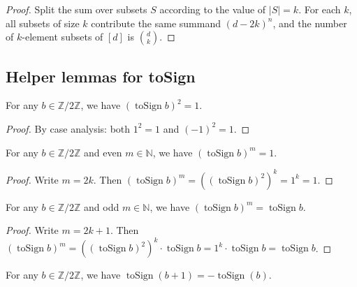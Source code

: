 \begin{proof}
\leanok
Split the sum over subsets $S$ according to the value of $|S| = k$.
For each $k$, all subsets of size $k$ contribute the same summand $(d-2k)^n$,
and the number of $k$-element subsets of $[d]$ is $\binom{d}{k}$.
\end{proof}

\subsection{Helper lemmas for toSign}

\begin{lemma}
\label{lem.cancel.toSign-sq}
\leanhelper
\leanok
For any $b \in \mathbb{Z}/2\mathbb{Z}$, we have $(\operatorname{toSign} b)^2 = 1$.
\end{lemma}

\begin{proof}
\leanok
By case analysis: both $1^2 = 1$ and $(-1)^2 = 1$.
\end{proof}

\begin{lemma}
\label{lem.cancel.toSign-pow-even}
\leanhelper
\leanok
For any $b \in \mathbb{Z}/2\mathbb{Z}$ and even $m \in \mathbb{N}$,
we have $(\operatorname{toSign} b)^m = 1$.
\end{lemma}

\begin{proof}
\leanok
Write $m = 2k$. Then $(\operatorname{toSign} b)^m = ((\operatorname{toSign} b)^2)^k = 1^k = 1$.
\end{proof}

\begin{lemma}
\label{lem.cancel.toSign-pow-odd}
\leanhelper
\leanok
For any $b \in \mathbb{Z}/2\mathbb{Z}$ and odd $m \in \mathbb{N}$,
we have $(\operatorname{toSign} b)^m = \operatorname{toSign} b$.
\end{lemma}

\begin{proof}
\leanok
Write $m = 2k + 1$. Then
$(\operatorname{toSign} b)^m = ((\operatorname{toSign} b)^2)^k \cdot \operatorname{toSign} b
= 1^k \cdot \operatorname{toSign} b = \operatorname{toSign} b$.
\end{proof}

\begin{lemma}
\label{lem.cancel.toSign-add-one}
\leanhelper
\leanok
For any $b \in \mathbb{Z}/2\mathbb{Z}$, we have
$\operatorname{toSign}(b+1) = -\operatorname{toSign}(b)$.
\end{lemma}


